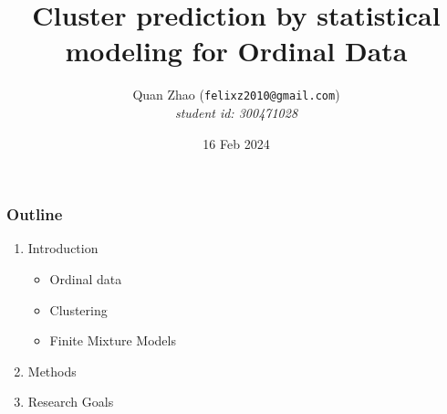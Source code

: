 \documentclass[xcolor=svgnames]{beamer}
\begin{document}
\title{Cluster prediction by statistical modeling for Ordinal Data}
\author{Quan Zhao ({\tt felixz2010@gmail.com})\\[1em]
{\em student id: 300471028}\\[1em]
}

\date{16 Feb 2024}


\begin{frame}\frametitle{
}
\titlepage
\end{frame}


\begin{frame}\frametitle{Outline}

\begin{enumerate}
\item Introduction
\begin{itemize}
\item Ordinal data
\item Clustering
\item Finite Mixture Models
\end{itemize}
\item Methods
\item Research Goals
\end{enumerate}

\end{frame}
\end{document}
